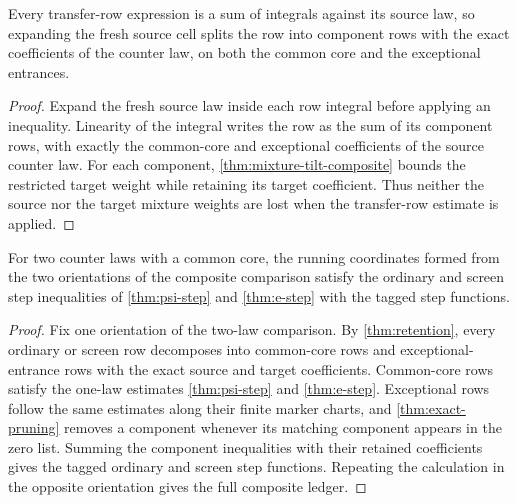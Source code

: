 \begin{lemma}
\label{thm:retention}
Every transfer-row expression is a sum of integrals against its source law, so expanding the
fresh source cell splits the row into component rows with the exact coefficients of the counter
law, on both the common core and the exceptional entrances.
\end{lemma}

\begin{proof}
Expand the fresh source law inside each row integral before applying an inequality. Linearity of
the integral writes the row as the sum of its component rows, with exactly the common-core and
exceptional coefficients of the source counter law. For each component,
\cref{thm:mixture-tilt-composite} bounds the restricted target weight while retaining its target
coefficient. Thus neither the source nor the target mixture weights are lost when the transfer-row
estimate is applied.
\end{proof}

\begin{proposition}
\label{thm:composite-ledger}
\leanok
{}
For two counter laws with a common core, the running coordinates formed from the two orientations
of the composite comparison satisfy the ordinary and screen step inequalities of
\cref{thm:psi-step} and \cref{thm:e-step} with the tagged step functions.
\end{proposition}

\begin{proof}
\leanok
{}
Fix one orientation of the two-law comparison. By \cref{thm:retention}, every ordinary or screen
row decomposes into common-core rows and exceptional-entrance rows with the exact source and target
coefficients. Common-core rows satisfy the one-law estimates
\cref{thm:psi-step} and \cref{thm:e-step}. Exceptional rows follow the same estimates along their
finite marker charts, and \cref{thm:exact-pruning} removes a component whenever its matching
component appears in the zero list. Summing the component inequalities with their retained
coefficients gives the tagged ordinary and screen step functions. Repeating the calculation in
the opposite orientation gives the full composite ledger.
\end{proof}

